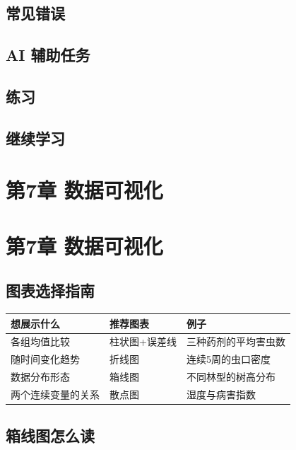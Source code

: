 \documentclass[
  letterpaper,
]{scrbook}
\newcounter{none} %
\begin{document}
\section{常见错误}\label{ux5e38ux89c1ux9519ux8bef-3}

\section{AI 辅助任务}\label{ai-ux8f85ux52a9ux4efbux52a1-2}

\section{练习}\label{ux7ec3ux4e60-5}

\section{继续学习}\label{ux7ee7ux7eedux5b66ux4e60-2}

\chapter{第7章
数据可视化}\label{ux7b2c7ux7ae0-ux6570ux636eux53efux89c6ux5316}

\chapter{第7章
数据可视化}\label{ux7b2c7ux7ae0-ux6570ux636eux53efux89c6ux5316-1}

\section{图表选择指南}\label{ux56feux8868ux9009ux62e9ux6307ux5357}

{\def\LTcaptype{none} %
\begin{longtable}[]{@{}lll@{}}
\toprule\noalign{}
想展示什么 & 推荐图表 & 例子 \\
\midrule\noalign{}
\endhead
\bottomrule\noalign{}
\endlastfoot
各组均值比较 & 柱状图+误差线 & 三种药剂的平均害虫数 \\
随时间变化趋势 & 折线图 & 连续5周的虫口密度 \\
数据分布形态 & 箱线图 & 不同林型的树高分布 \\
两个连续变量的关系 & 散点图 & 湿度与病害指数 \\
\end{longtable}
}

\section{箱线图怎么读}\label{ux7bb1ux7ebfux56feux600eux4e48ux8bfb}
\end{document}

